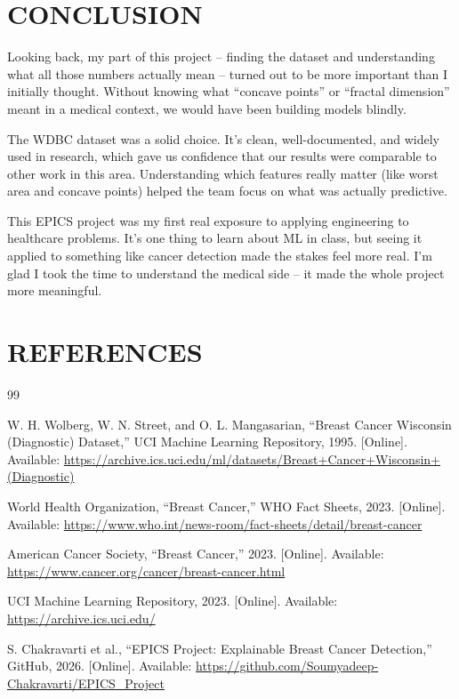 \documentclass[12pt]{article}
\begin{document}
\newpage
\section{CONCLUSION}

Looking back, my part of this project -- finding the dataset and understanding what all those numbers actually mean -- turned out to be more important than I initially thought. Without knowing what ``concave points'' or ``fractal dimension'' meant in a medical context, we would have been building models blindly.

The WDBC dataset was a solid choice. It's clean, well-documented, and widely used in research, which gave us confidence that our results were comparable to other work in this area. Understanding which features really matter (like worst area and concave points) helped the team focus on what was actually predictive.

This EPICS project was my first real exposure to applying engineering to healthcare problems. It's one thing to learn about ML in class, but seeing it applied to something like cancer detection made the stakes feel more real. I'm glad I took the time to understand the medical side -- it made the whole project more meaningful.

\newpage
\section{REFERENCES}

\begin{thebibliography}{99}

W. H. Wolberg, W. N. Street, and O. L. Mangasarian, ``Breast Cancer Wisconsin (Diagnostic) Dataset,'' UCI Machine Learning Repository, 1995. [Online]. Available: \url{https://archive.ics.uci.edu/ml/datasets/Breast+Cancer+Wisconsin+(Diagnostic)}

World Health Organization, ``Breast Cancer,'' WHO Fact Sheets, 2023. [Online]. Available: \url{https://www.who.int/news-room/fact-sheets/detail/breast-cancer}

American Cancer Society, ``Breast Cancer,'' 2023. [Online]. Available: \url{https://www.cancer.org/cancer/breast-cancer.html}

UCI Machine Learning Repository, 2023. [Online]. Available: \url{https://archive.ics.uci.edu/}

S. Chakravarti et al., ``EPICS Project: Explainable Breast Cancer Detection,'' GitHub, 2026. [Online]. Available: \url{https://github.com/Soumyadeep-Chakravarti/EPICS_Project}

\end{thebibliography}
\end{document}
